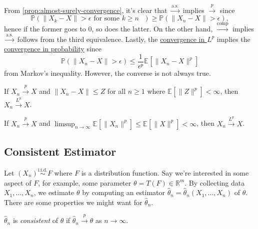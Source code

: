 From \autoref{prop:almost-surely-convergence}, it's clear that \(\overset{\text{a.s.} }{\to } \) implies \(\overset{p}{\to } \) since
\[
	\mathbb{P} (\lVert X_k - X \rVert > \epsilon \text{ for some \(k \geq n\) } )
	\geq \mathbb{P} (\lVert X_n - X \rVert > \epsilon ),
\]
hence if the former goes to \(0\), so does the latter. On the other hand, \(\overset{\text{comp} }{\to } \) implies \(\overset{\text{a.s.} }{\to } \) follows from the third equivalence. Lastly, the \hyperref[def:converge-in-Lp]{convergence in \(L^p\)} implies the \hyperref[def:converge-in-probability]{convergence in probability} since
\[
	\mathbb{P} (\lVert X_n - X \rVert > \epsilon )
	\leq \frac{1}{\epsilon ^p} \mathbb{E}_{}\left[\lVert X_n - X \rVert ^p \right]
\]
from Markov's inequality. However, the converse is not always true.

\begin{theorem}\label{thm:DCT}
	If \(X_n \overset{p}{\to } X\) and \(\lVert X_n - X \rVert \leq Z\) for all \(n \geq 1\) where \(\mathbb{E}_{}\left[\lVert Z \rVert ^p \right] < \infty \), then \(X_n \overset{L^p}{\to } X\).
\end{theorem}

\begin{theorem}\label{thm:Scheffe}
	If \(X_n \overset{p}{\to } X\) and \(\limsup_{n \to \infty} \mathbb{E}_{}\left[\lVert X_n \rVert ^p \right] \leq \mathbb{E}_{}\left[\lVert X \rVert ^p \right] < \infty \), then \(X_n \overset{L^p}{\to } X\).
\end{theorem}

\subsection{Consistent Estimator}
Let \((X_n) \overset{\text{i.i.d.} }{\sim } F\) where \(F\) is a distribution function. Say we're interested in some aspect of \(F\), for example, some parameter \(\theta = T(F) \in \mathbb{R} ^m\). By collecting data \(X_1, \dots , X_n\), we estimate \(\theta \) by computing an estimator \(\hat{\theta} _n = \hat{\theta} _n(X_1, \dots , X_n)\) of \(\theta \). There are some properties we might want for \(\hat{\theta} _n\).

\begin{definition}[Consistent]\label{def:consistent}
	\(\hat{\theta} _n\) is \emph{consistent} of \(\theta \) if \(\hat{\theta} _n \overset{p}{\to } \theta \) as \(n \to \infty \).
\end{definition}


